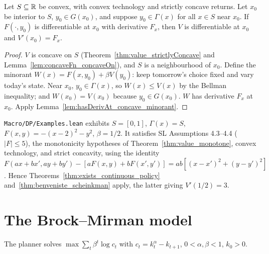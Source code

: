 \begin{theorem}
\label{thm:benveniste_scheinkman}
\leanok
{}
Let $S \subseteq \mathbb{R}$ be convex, with convex technology and strictly concave returns. Let $x_0$ be interior to
$S$, $y_0 \in G(x_0)$, and suppose $y_0 \in \Gamma(x)$ for all $x \in S$ near $x_0$. If $F(\cdot, y_0)$ is
differentiable at $x_0$ with derivative $F_x$, then $V$ is differentiable at $x_0$ and $V'(x_0) = F_x$.
\end{theorem}
\begin{proof}
\leanok
$V$ is concave on $S$ (Theorem~\ref{thm:value_strictlyConcave} and Lemma~\ref{lem:concaveFn_concaveOn}),
and $S$ is a neighbourhood of $x_0$. Define the minorant $W(x) = F(x, y_0) + \beta V(y_0)$: keep
tomorrow's choice fixed and vary today's state. Near $x_0$, $y_0 \in \Gamma(x)$, so $W(x) \le V(x)$ by the
Bellman inequality; and $W(x_0) = V(x_0)$ because $y_0 \in G(x_0)$. $W$ has derivative $F_x$ at $x_0$.
Apply Lemma~\ref{lem:hasDerivAt_concave_minorant}.
\end{proof}

\begin{remark}
\label{rem:dp_example}
\leanok
{}
\texttt{Macro/DP/Examples.lean} exhibits $S = [0, 1]$, $\Gamma(x) = S$, $F(x, y) = -(x - 2)^2 - y^2$,
$\beta = 1/2$. It satisfies SL Assumptions 4.3--4.4 ($|F| \le 5$), the monotonicity hypotheses of
Theorem~\ref{thm:value_monotone}, convex technology, and strict concavity, using the identity
$F(ax + bx', ay + by') - [a F(x, y) + b F(x', y')] = ab[(x - x')^2 + (y - y')^2]$. Hence
Theorems~\ref{thm:exists_continuous_policy} and~\ref{thm:benveniste_scheinkman} apply, the latter giving
$V'(1/2) = 3$.
\end{remark}

\section{The Brock--Mirman model}
\label{sec:brock_mirman}

The planner solves $\max \sum_t \beta^t \log c_t$ with $c_t = k_t^\alpha - k_{t+1}$, $0 < \alpha, \beta < 1$,
$k_0 > 0$.

